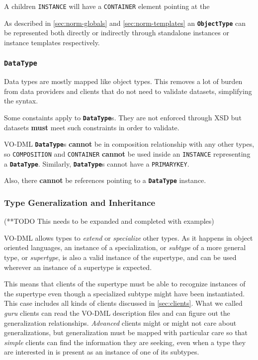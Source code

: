\documentclass[11pt,a4paper]{ivoa}
\begin{document}
A children \texttt{INSTANCE} will have a \texttt{CONTAINER} element
pointing at the

As described in \ref{sec:norm-globals} and \ref{sec:norm-templates} an
\textbf{\texttt{ObjectType}} can be represented both directly or
indirectly through standalone instances or instance templates
respectively.

\subsubsection{\textbf{\texttt{DataType}}}\label{sec:norm-data}

Data types are mostly mapped like object types. This removes a lot of
burden from data providers and clients that do not need to validate
datasets, simplifying the syntax.

Some constaints apply to \textbf{\texttt{DataType}}s. They are not
enforced through XSD but datasets \textbf{must} meet such constraints in
order to validate.

VO-DML \textbf{\texttt{DataType}}s \textbf{cannot} be in composition
relationship with any other types, so \texttt{COMPOSITION} and
\texttt{CONTAINER} \textbf{cannot} be used inside an \texttt{INSTANCE}
representing a \textbf{\texttt{DataType}}. Similarly,
\textbf{\texttt{DataType}}s cannot have a \texttt{PRIMARYKEY}.

Also, there \textbf{cannot} be references pointing to a
\textbf{\texttt{DataType}} instance.

\subsubsection{Type Generalization and
Inheritance}\label{type-generalization-and-inheritance}

(**TODO This needs to be expanded and completed with examples)

VO-DML allows types to \emph{extend} or \emph{specialize} other types.
As it happens in object oriented languages, an instance of a
specialization, or \emph{subtype} of a more general type, or
\emph{supertype}, is also a valid instance of the supertype, and can be
used wherever an instance of a supertype is expected.

This means that clients of the supertype must be able to recognize
instances of the supertype even though a specialized subtype might have
been instantiated. This case includes all kinds of clients discussed in
\ref{sec:clients}. What we called \emph{guru} clients can read the
VO-DML description files and can figure out the generalization
relationships. \emph{Advanced} clients might or might not care about
generalizations, but generalization must be mapped with particular care
so that \emph{simple} clients can find the information they are seeking,
even when a type they are interested in is present as an instance of one
of its subtypes.
\end{document}
